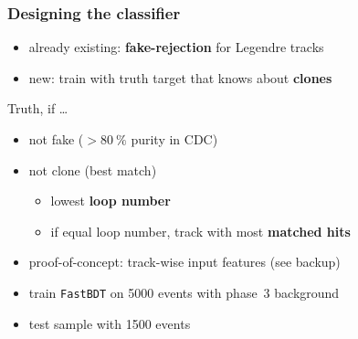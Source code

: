 \documentclass[18pt, aspectratio=169]{beamer}
\begin{document}
\begin{frame}
  \frametitle{Designing the classifier}
  \begin{itemize}
  \item already existing: \textbf{fake-rejection} for Legendre tracks\\
  \item new: train with truth target that knows about \textbf{clones}
  \end{itemize}
  \begin{block}{Truth, if \ldots}
    \begin{itemize}
    \item not fake ($ > \SI{80}{\percent}$ purity in CDC)
    \item not clone (best match)
      \begin{itemize}
      \item lowest \textbf{loop number}
      \item if equal loop number, track with most \textbf{matched hits}
      \end{itemize}
    \end{itemize}

  \end{block}
  \begin{itemize}
  \item proof-of-concept: track-wise input features (see backup)
  \item train \texttt{FastBDT} on 5000 events with phase~3 background
  \item test sample with 1500 events
  \end{itemize}
\end{frame}
\end{document}

